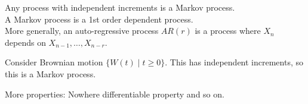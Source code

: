 \documentclass[a4paper]{article}
\newcommand{\nl}{\vspace{0.2cm}\\}
\begin{document}
Any process with independent increments is a Markov process.\nl
A Markov process is a 1st order dependent process.\nl
More generally, an auto-regressive process $AR(r)$ is a process where $X_n$ depends on $X_{n-1}, \ldots, X_{n-r}$.\nl

\begin{eg}
    Consider Brownian motion $\{W(t) \mid t \ge 0\}$. This has independent increments, so this is a Markov process.
\end{eg}

More properties: Nowhere differentiable property and so on.
\end{document}
